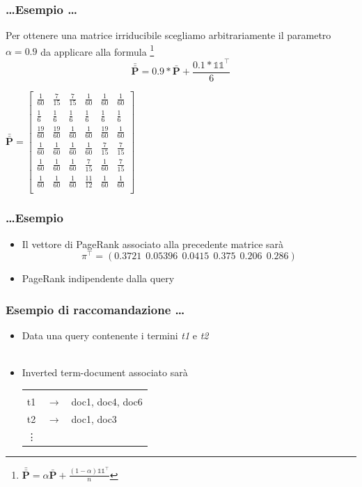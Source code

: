 \documentclass{beamer}
\begin{document}
\begin{frame}
	\frametitle{\dots Esempio \dots}
	Per ottenere una matrice irriducibile scegliamo arbitrariamente il parametro $\alpha=0.9$ da applicare alla formula \footnote{$\bar{\bar{\textbf{P}}} = \alpha\bar{\textbf{P}} + \frac{(1-\alpha)\mathbb{11}^\intercal}{n}$}
	$$\bar{\bar{\textbf{P}}} = 0.9*\bar{\textbf{P}} + \frac{0.1*\mathbb{11}^\intercal}{6}$$
	\begin{center}
		$\bar{\bar{\textbf{P}}} = \begin{bmatrix}
		\frac{1}{60} & \frac{7}{15}  & \frac{7}{15} & \frac{1}{60} &\frac{1}{60} &\frac{1}{60} \\[0.3em]
		\frac{1}{6}  & \frac{1}{6}   & \frac{1}{6}  & \frac{1}{6}  &\frac{1}{6}  &\frac{1}{6}  \\[0.3em]
		\frac{19}{60}& \frac{19}{60} & \frac{1}{60} & \frac{1}{60} &\frac{19}{60}&\frac{1}{60} \\[0.3em]
		\frac{1}{60} & \frac{1}{60}  & \frac{1}{60} & \frac{1}{60} &\frac{7}{15} &\frac{7}{15} \\[0.3em]
		\frac{1}{60} & \frac{1}{60}  & \frac{1}{60} & \frac{7}{15} &\frac{1}{60} &\frac{7}{15} \\[0.3em]
		\frac{1}{60} & \frac{1}{60}  & \frac{1}{60} & \frac{11}{12}&\frac{1}{60} &\frac{1}{60} \\[0.3em]
		\end{bmatrix}$
	\end{center}
\end{frame}
\begin{frame}
	\frametitle{\dots Esempio}
	\begin{itemize}
		\item Il vettore di PageRank associato alla precedente matrice sarà $$\pi^\intercal=(0.3721~~0.05396~~0.0415~~0.375~~0.206~~0.286)$$
		\item PageRank indipendente dalla query
	\end{itemize}
\end{frame}
\begin{frame}
	\frametitle{Esempio di raccomandazione \dots}
	\begin{itemize}
		\item Data una query contenente i termini \emph{t1} e \emph{t2} \\~\\
		\item Inverted term-document associato sarà
		\begin{center}
			\begin{tabular}{ l c l }
				&&\\
				t1 & $\longrightarrow$ & doc1, doc4, doc6 \\
				t2 & $\longrightarrow$ & doc1, doc3 \\
				\vdots & & \\
			\end{tabular}
		\end{center}
	\end{itemize}
\end{frame}
\end{document}
